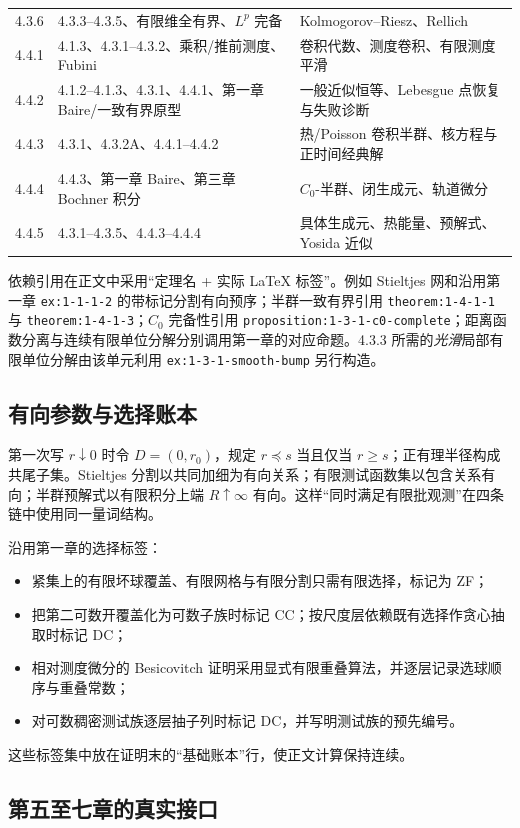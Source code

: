 \documentclass[11pt,a4paper]{ctexart}
\begin{document}
\begin{longtable}{p{}p{}p{}}
4.3.6 & 4.3.3--4.3.5、有限维全有界、$L^p$ 完备 & Kolmogorov--Riesz、Rellich\\
4.4.1 & 4.1.3、4.3.1--4.3.2、乘积/推前测度、Fubini & 卷积代数、测度卷积、有限测度平滑\\
4.4.2 & 4.1.2--4.1.3、4.3.1、4.4.1、第一章 Baire/一致有界原型 & 一般近似恒等、Lebesgue 点恢复与失败诊断\\
4.4.3 & 4.3.1、4.3.2A、4.4.1--4.4.2 & 热/Poisson 卷积半群、核方程与正时间经典解\\
4.4.4 & 4.4.3、第一章 Baire、第三章 Bochner 积分 & $C_0$-半群、闭生成元、轨道微分\\
4.4.5 & 4.3.1--4.3.5、4.4.3--4.4.4 & 具体生成元、热能量、预解式、Yosida 近似\\
\bottomrule
\end{longtable}

依赖引用在正文中采用“定理名 + 实际 LaTeX 标签”。例如 Stieltjes 网和沿用第一章
\texttt{ex:1-1-1-2} 的带标记分割有向预序；半群一致有界引用
\texttt{theorem:1-4-1-1} 与 \texttt{theorem:1-4-1-3}；$C_0$ 完备性引用
\texttt{proposition:1-3-1-c0-complete}；距离函数分离与连续有限单位分解分别调用第一章的对应命题。4.3.3 所需的\emph{光滑}局部有限单位分解由该单元利用
\texttt{ex:1-3-1-smooth-bump} 另行构造。

\subsection{有向参数与选择账本}

第一次写 $r\downarrow0$ 时令 $D=(0,r_0)$，规定 $r\preceq s$ 当且仅当 $r\ge s$；正有理半径构成共尾子集。Stieltjes 分割以共同加细为有向关系；有限测试函数集以包含关系有向；半群预解式以有限积分上端 $R\uparrow\infty$ 有向。这样“同时满足有限批观测”在四条链中使用同一量词结构。

沿用第一章的选择标签：
\begin{itemize}
\item 紧集上的有限坏球覆盖、有限网格与有限分割只需有限选择，标记为 ZF；
\item 把第二可数开覆盖化为可数子族时标记 CC；按尺度层依赖既有选择作贪心抽取时标记 DC；
\item 相对测度微分的 Besicovitch 证明采用显式有限重叠算法，并逐层记录选球顺序与重叠常数；
\item 对可数稠密测试族逐层抽子列时标记 DC，并写明测试族的预先编号。
\end{itemize}
这些标签集中放在证明末的“基础账本”行，使正文计算保持连续。

\subsection{第五至七章的真实接口}
\end{document}
